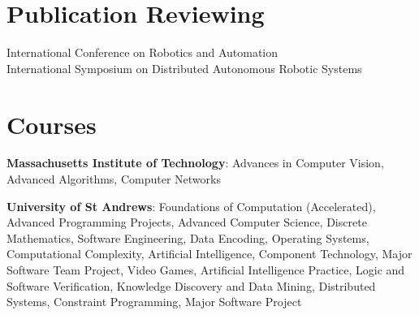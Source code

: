 \documentclass[line,margin]{cv}
\begin{document}
\begin{resume}
\section{Publication Reviewing}
International Conference on Robotics and Automation\\
International Symposium on Distributed Autonomous Robotic Systems

\section{Courses}

\textbf{Massachusetts Institute of Technology}:
Advances in Computer Vision, Advanced Algorithms, Computer Networks

\textbf{University of St Andrews}:
Foundations of Computation (Accelerated), Advanced Programming Projects,
Advanced Computer Science, Discrete Mathematics, Software Engineering,
Data Encoding, Operating Systems, Computational Complexity,
Artificial Intelligence, Component Technology, Major Software Team Project,
Video Games, Artificial Intelligence Practice, Logic and Software Verification,
Knowledge Discovery and Data Mining, Distributed Systems, Constraint Programming,
Major Software Project

\end{resume}
\end{document}
